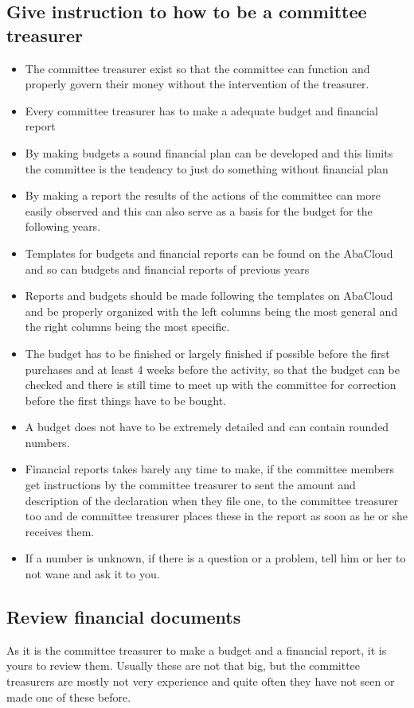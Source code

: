 \documentclass{report}
\begin{document}
\subsection{Give instruction to how to be a committee treasurer}
\begin{itemize} 
\vspace{-1mm}
\itemsep-1mm 
\item The committee treasurer exist so that the committee can function and properly govern their money without the intervention of the treasurer.
\item Every committee treasurer has to make a adequate budget and financial report
\item By making budgets a sound financial plan can be developed and this limits the committee is the tendency to just do something without financial plan 
\item By making a report the results of the actions of the committee can more easily observed and this can also serve as a basis for the budget for the following years. 
\item Templates for budgets and financial reports can be found on the AbaCloud and so can budgets and financial reports of previous years
\item Reports and budgets should be made following the templates on AbaCloud and be properly organized with the left columns being the most general and the right columns being the most specific.
\item The budget has to be finished or largely finished if possible before the first purchases and at least 4 weeks before the activity, so that the budget can be checked and there is still time to meet up with the committee for correction before the first things have to be bought.    
\item A budget does not have to be extremely detailed and can contain rounded numbers. 
\item Financial reports takes barely any time to make, if the committee members get instructions by the committee treasurer to sent the amount and description of the declaration when they file one, to the committee treasurer too and de committee treasurer places these in the report as soon as he or she receives them. 
\item If a number is unknown, if there is a question or a problem, tell him or her to not wane and ask it to you.
\end{itemize}

\subsection{Review financial documents}
As it is the committee treasurer to make a budget and a financial report, it is yours to review them. Usually these are not that big, but the committee treasurers are mostly not very experience and quite often they have not seen or made one of these before.  
\end{document}

